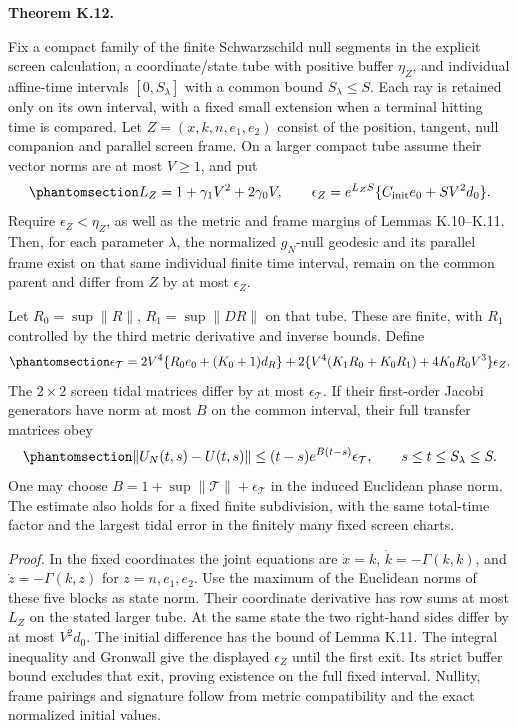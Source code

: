 \documentclass[
  english,
  11pt,
  reqno]{amsart}
\makeatletter
\newcommand{\pandocstatementheading}[1]{%
  \par\addpenalty{\@beginparpenalty}%
  \addvspace{.5\baselineskip plus .2\baselineskip minus .2\baselineskip}%
  {\normalfont\bfseries #1\par}%
  \nobreak\@afterindenttrue\@afterheading
}
\makeatother
\begin{document}
\pandocstatementheading{\protect{}\label{thm:sh-finite-optical-stability}Theorem K.12.}

Fix a compact family of the finite Schwarzschild null segments in the
explicit screen calculation, a coordinate/state tube with positive
buffer \(\eta_Z\), and individual affine-time intervals
\([0,S_\lambda]\) with a common bound \(S_\lambda\le S\). Each ray is
retained only on its own interval, with a fixed small extension when a
terminal hitting time is compared. Let \(Z=(x,k,n,e_1,e_2)\) consist of
the position, tangent, null companion and parallel screen frame. On a
larger compact tube assume their vector norms are at most \(V\ge1\), and
put
\begin{equation}\protect\phantomsection\label{eq:sh-geodesic-frame-error}{
 L_Z=1+\gamma_1 V^2+2\gamma_0V,\qquad
 \epsilon_Z=e^{L_ZS}\{C_{\rm init}e_0+SV^2d_0\}.
}\end{equation} Require \(\epsilon_Z<\eta_Z\), as well as the metric and
frame margins of Lemmas K.10--K.11. Then, for each parameter
\(\lambda\), the normalized \(g_N\)-null geodesic and its parallel frame
exist on that same individual finite time interval, remain on the common
parent and differ from \(Z\) by at most \(\epsilon_Z\).

Let \(R_0=\sup\|R\|\), \(R_1=\sup\|DR\|\) on that tube. These are
finite, with \(R_1\) controlled by the third metric derivative and
inverse bounds. Define
\begin{equation}\protect\phantomsection\label{eq:sh-tidal-error}{
 \epsilon_{\mathcal T}=2V^4\{R_0e_0+(K_0+1)d_R\}
 +2\{V^4(K_1R_0+K_0R_1)+4K_0R_0V^3\}\epsilon_Z.
}\end{equation} The \(2\times2\) screen tidal matrices differ by at most
\(\epsilon_{\mathcal T}\). If their first-order Jacobi generators have
norm at most \(B\) on the common interval, their full transfer matrices
obey
\begin{equation}\protect\phantomsection\label{eq:sh-jacobi-transfer-error}{
 \|U_N(t,s)-U(t,s)\|
 \le (t-s)e^{B(t-s)}\epsilon_{\mathcal T},\qquad s\le t\le S_\lambda\le S.
}\end{equation} One may choose
\(B=1+\sup\|\mathcal T\|+\epsilon_{\mathcal T}\) in the induced
Euclidean phase norm. The estimate also holds for a fixed finite
subdivision, with the same total-time factor and the largest tidal error
in the finitely many fixed screen charts.

\emph{Proof.} In the fixed coordinates the joint equations are
\(\dot x=k\), \(\dot k=-\Gamma(k,k)\), and \(\dot z=-\Gamma(k,z)\) for
\(z=n,e_1,e_2\). Use the maximum of the Euclidean norms of these five
blocks as state norm. Their coordinate derivative has row sums at most
\(L_Z\) on the stated larger tube. At the same state the two right-hand
sides differ by at most \(V^2d_0\). The initial difference has the bound
of Lemma K.11. The integral inequality and Gronwall give the displayed
\(\epsilon_Z\) until the first exit. Its strict buffer bound excludes
that exit, proving existence on the full fixed interval. Nullity, frame
pairings and signature follow from metric compatibility and the exact
normalized initial values.
\end{document}
